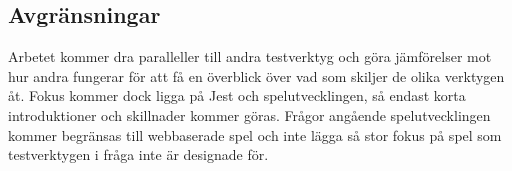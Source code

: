 \subsection{Avgränsningar}
Arbetet kommer dra paralleller till andra testverktyg och göra jämförelser mot hur andra fungerar för att få en överblick över vad som skiljer de olika verktygen åt. Fokus kommer dock ligga på Jest och spelutvecklingen, så endast korta introduktioner och skillnader kommer göras. Frågor angående spelutvecklingen kommer begränsas till webbaserade spel och inte lägga så stor fokus på spel som testverktygen i fråga inte är designade för. 





